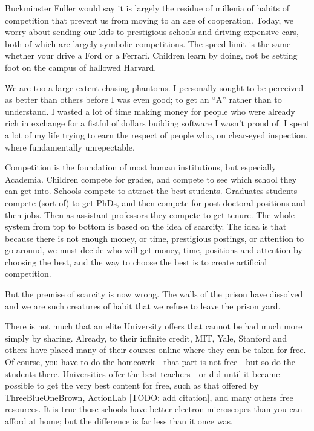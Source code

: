 \documentclass[
	fontsize=10pt, %
	twoside=false, %
	secnumdepth=1, %
]{kaobook}
\begin{document}
Buckminster Fuller would say it is largely the residue
of millenia of habits of competition that prevent us
from moving to an age of cooperation.
Today, we worry about sending our kids to prestigious schools
and driving expensive cars, both of which are largely
symbolic competitions. The speed limit is the same
whether your drive a Ford or a Ferrari.
Children learn by doing, not be setting foot on
the campus of hallowed Harvard.

We are too a large extent chasing phantoms.
I personally sought to be perceived as better than others before I was even good;
to get an ``A'' rather than to understand.
I wasted a lot of time making money for people
who were already rich in exchange for a fistful of dollars
building software I wasn't proud of.
I spent a lot of my life trying to earn the respect of
people who, on clear-eyed inspection, where fundamentally
unrepectable.

Competition is the foundation of most human institutions, but especially Academia.
Children compete for grades, and compete to see which school they can get into.
Schools compete to attract the best students. Graduates students compete (sort of)
to get PhDs, and then compete for post-doctoral positions and then jobs. Then
as assistant professors they compete to get tenure.
The whole system from top to bottom is based on the idea of scarcity.
The idea is that because there is not enough money, or time, prestigious postings, or attention to
go around, we must decide who will get money, time, positions and attention by choosing the
best, and the way to choose the best is to create artificial competition.

But the premise of scarcity is now wrong. The walls of the prison have
dissolved and we are such creatures of habit that we refuse to leave the prison yard.

There is not much that an elite University offers that cannot be had much
more simply by sharing.
Already, to their infinite credit, MIT, Yale, Stanford and others have placed many
of their courses online where they can be taken for free. Of course, you have to do
the homeowrk---that part is not free---but so do the students there.
Universities offer the best teachers---or did until it became possible to get the
very best content for free, such as that offered by ThreeBlueOneBrown, ActionLab [TODO: add citation],
and many others free resources.
It is true those schools have better electron microscopes than you can afford at home;
but the difference is far less than it once was.
\end{document}
